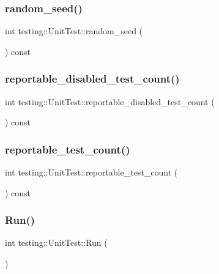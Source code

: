 \subsubsection{\texorpdfstring{random\_seed()}{random\_seed()}}
{\footnotesize\ttfamily int testing\+::\+Unit\+Test\+::random\+\_\+seed (\begin{DoxyParamCaption}{ }\end{DoxyParamCaption}) const}

\mbox{\label{classtesting_1_1_unit_test_a2a2835db178d5c8569507db9f0a3d54f}} 
\subsubsection{\texorpdfstring{reportable\_disabled\_test\_count()}{reportable\_disabled\_test\_count()}}
{\footnotesize\ttfamily int testing\+::\+Unit\+Test\+::reportable\+\_\+disabled\+\_\+test\+\_\+count (\begin{DoxyParamCaption}{ }\end{DoxyParamCaption}) const}

\mbox{\label{classtesting_1_1_unit_test_a449d0e0350ef146040cd37679c005248}} 
\subsubsection{\texorpdfstring{reportable\_test\_count()}{reportable\_test\_count()}}
{\footnotesize\ttfamily int testing\+::\+Unit\+Test\+::reportable\+\_\+test\+\_\+count (\begin{DoxyParamCaption}{ }\end{DoxyParamCaption}) const}

\mbox{\label{classtesting_1_1_unit_test_a2febc800536b44500565f4c423f359d3}} 
\subsubsection{\texorpdfstring{Run()}{Run()}}
{\footnotesize\ttfamily int testing\+::\+Unit\+Test\+::\+Run (\begin{DoxyParamCaption}{ }\end{DoxyParamCaption})}

